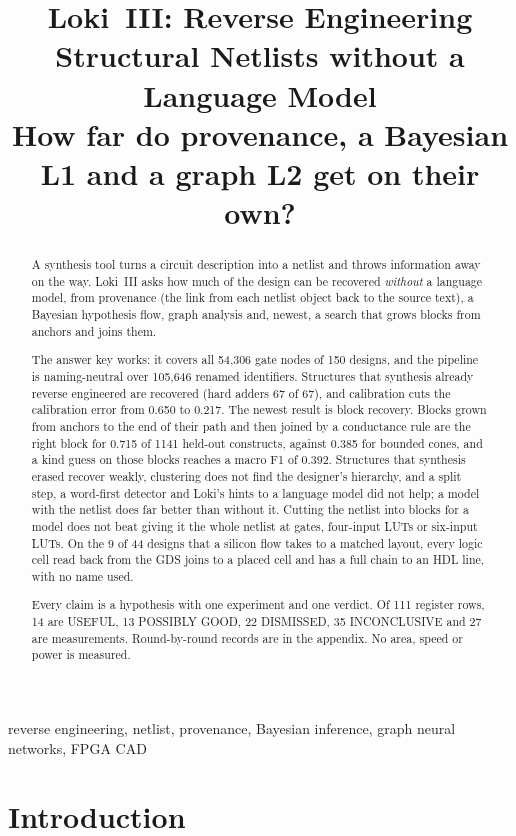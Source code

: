 \documentclass[conference]{IEEEtran}
\title{Loki~III: Reverse Engineering Structural Netlists without a Language Model\\
How far do provenance, a Bayesian L1 and a graph L2 get on their own?}
\author{\IEEEauthorblockN{Peter Jamieson}
\IEEEauthorblockA{Electrical and Computer Engineering, Miami University\\
Oxford, OH, USA\\
jamiespa@miamioh.edu}}
\begin{document}
\maketitle

\begin{abstract}
A synthesis tool turns a circuit description into a netlist and throws information away on the
way. Loki~III asks how much of the design can be recovered \emph{without} a language model,
from provenance (the link from each netlist object back to the source text), a Bayesian
hypothesis flow, graph analysis and, newest, a search that grows blocks from anchors and joins them.

The answer key works: it covers all 54,306 gate nodes of 150 designs, and the pipeline is
naming-neutral over 105,646 renamed identifiers. Structures that synthesis already reverse
engineered are recovered (hard adders 67 of 67), and calibration cuts the calibration error from
0.650 to 0.217. The newest result is block recovery. Blocks grown from anchors to the end of
their path and then joined by a conductance rule are the right block for 0.715 of 1141 held-out
constructs, against 0.385 for bounded cones, and a kind guess on those blocks reaches a macro F1
of 0.392. Structures that synthesis erased recover weakly, clustering does not find the
designer's hierarchy, and a split step, a word-first detector and Loki's hints to a language model
did not help; a model with the netlist does far better than without it. Cutting the netlist into blocks for a model does not beat giving it the whole netlist at gates, four-input LUTs or six-input LUTs. On the 9 of 44 designs that a silicon flow takes to a matched layout, every logic cell read back from the GDS joins to a placed cell and has a full chain to an HDL line, with no name used.

Every claim is a hypothesis with one experiment and one verdict. Of 111 register rows, 14 are
USEFUL, 13 POSSIBLY GOOD, 22 DISMISSED, 35 INCONCLUSIVE and 27 are measurements. Round-by-round
records are in the appendix. No area, speed or power is measured.
\end{abstract}

\begin{IEEEkeywords}
reverse engineering, netlist, provenance, Bayesian inference, graph neural networks, FPGA CAD
\end{IEEEkeywords}

\section{Introduction}
\label{sec:intro}
\end{document}
